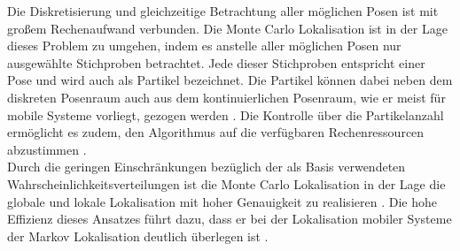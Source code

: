 Die Diskretisierung und gleichzeitige Betrachtung aller möglichen Posen ist mit großem Rechenaufwand verbunden. Die Monte Carlo Lokalisation ist in der Lage dieses Problem zu umgehen, indem es anstelle aller möglichen Posen nur ausgewählte Stichproben betrachtet. Jede dieser Stichproben entspricht einer Pose und wird auch als Partikel bezeichnet. Die Partikel können dabei neben dem diskreten Posenraum auch aus dem kontinuierlichen Posenraum, wie er meist für mobile Systeme vorliegt, gezogen werden \cite{Fox2001}. Die Kontrolle über die Partikelanzahl ermöglicht es zudem, den Algorithmus auf die verfügbaren Rechenressourcen abzustimmen \cite{Thrun2001}.\\
Durch die geringen Einschränkungen bezüglich der als Basis verwendeten Wahrscheinlichkeitsverteilungen ist die Monte Carlo Lokalisation in der Lage die globale und lokale Lokalisation mit hoher Genauigkeit zu realisieren \cite{Thrun2005}. Die hohe Effizienz dieses Ansatzes führt dazu, dass er bei der Lokalisation mobiler Systeme der Markov Lokalisation deutlich überlegen ist \cite{Fox2001}.

\\

\\


